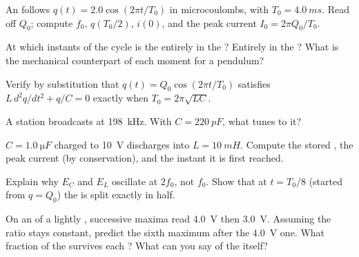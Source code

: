 \begin{exercise}[$\star$]\label{exo:g12:rlc-oscillations:4}
An  follows $q(t) = 2.0\cos(2\pi t/T_0)$ in microcoulombs,
with $T_0 = \qty{4.0}{ms}$. Read off $Q_0$; compute $f_0$, $q(T_0/2)$,
$i(0)$, and the peak current $I_0 = 2\pi Q_0/T_0$.
\end{exercise}

\begin{exercise}[$\star$]\label{exo:g12:rlc-oscillations:5}
At which instants of the cycle is the  entirely in the
? Entirely in the ? What is the mechanical counterpart of
each moment for a pendulum?
\end{exercise}

\begin{exercise}[$\star\star$]\label{exo:g12:rlc-oscillations:6}
Verify by substitution that $q(t) = Q_0\cos(2\pi t/T_0)$ satisfies
$L\,d^2q/dt^2 + q/C = 0$ exactly when $T_0 = 2\pi\sqrt{LC}$.
\end{exercise}

\begin{exercise}[$\star\star$]\label{exo:g12:rlc-oscillations:7}
A  station broadcasts at \qty{198}{kHz}. With
$C = \qty{220}{pF}$, what  tunes to it?
\end{exercise}

\begin{exercise}[$\star\star$]\label{exo:g12:rlc-oscillations:8}
$C = \qty{1.0}{\micro F}$ charged to \qty{10}{V} discharges into
$L = \qty{10}{mH}$. Compute the stored , the peak current (by
 conservation), and the instant it is first reached.
\end{exercise}

\begin{exercise}[$\star\star$]\label{exo:g12:rlc-oscillations:9}
Explain why $E_C$ and $E_L$ oscillate at  $2f_0$, not $f_0$.
Show that at $t = T_0/8$ (started from $q = Q_0$) the  is split
exactly in half.
\end{exercise}

\begin{exercise}[$\star\star$]\label{exo:g12:rlc-oscillations:10}
On an  of a lightly  , successive maxima
read \qty{4.0}{V} then \qty{3.0}{V}. Assuming the ratio stays
constant, predict the sixth maximum after the \qty{4.0}{V} one. What
fraction of the \emph{} survives each ? What can
you say of the  itself?
\end{exercise}

